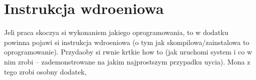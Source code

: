 \chapter{Instrukcja wdroeniowa}
Jeli praca skoczya si wykonaniem jakiego oprogramowania, to w dodatku powinna pojawi si instrukcja wdroeniowa (o tym jak skompilowa/zainstalowa to oprogramowanie).
Przydaoby si rwnie  krtkie how to (jak uruchomi system i co w nim zrobi -- zademonstrowane na jakim najprostszym przypadku uycia). Mona z tego zrobi osobny dodatek,